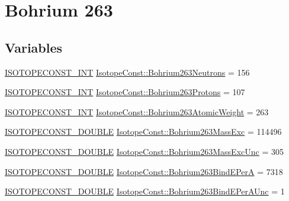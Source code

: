 \hypertarget{group___isotope_const-_bohrium-_bh263}{}\section{Bohrium 263}
\label{group___isotope_const-_bohrium-_bh263}
\subsection*{Variables}
\begin{DoxyCompactItemize}
\item 
\mbox{\hyperlink{group___isotope_const-_macros_ga5f18360b3e99483a35c32d789e62621c}{I\+S\+O\+T\+O\+P\+E\+C\+O\+N\+S\+T\+\_\+\+I\+NT}} \mbox{\hyperlink{group___isotope_const-_bohrium-_bh263_gabe146e083f2eaa5c4b29826724b8ebb7}{Isotope\+Const\+::\+Bohrium263\+Neutrons}} = 156
\item 
\mbox{\hyperlink{group___isotope_const-_macros_ga5f18360b3e99483a35c32d789e62621c}{I\+S\+O\+T\+O\+P\+E\+C\+O\+N\+S\+T\+\_\+\+I\+NT}} \mbox{\hyperlink{group___isotope_const-_bohrium-_bh263_ga82f6efe19e6ddfce1a8f6f28561320ca}{Isotope\+Const\+::\+Bohrium263\+Protons}} = 107
\item 
\mbox{\hyperlink{group___isotope_const-_macros_ga5f18360b3e99483a35c32d789e62621c}{I\+S\+O\+T\+O\+P\+E\+C\+O\+N\+S\+T\+\_\+\+I\+NT}} \mbox{\hyperlink{group___isotope_const-_bohrium-_bh263_gaa48fe65d50dc0d74b90ad1e79e9abb12}{Isotope\+Const\+::\+Bohrium263\+Atomic\+Weight}} = 263
\item 
\mbox{\hyperlink{group___isotope_const-_macros_ga8f45a7272ce02c0b4c65c44636ed719a}{I\+S\+O\+T\+O\+P\+E\+C\+O\+N\+S\+T\+\_\+\+D\+O\+U\+B\+LE}} \mbox{\hyperlink{group___isotope_const-_bohrium-_bh263_gabc855dd410f304a103fd7f09513dd2cd}{Isotope\+Const\+::\+Bohrium263\+Mass\+Exc}} = 114496
\item 
\mbox{\hyperlink{group___isotope_const-_macros_ga8f45a7272ce02c0b4c65c44636ed719a}{I\+S\+O\+T\+O\+P\+E\+C\+O\+N\+S\+T\+\_\+\+D\+O\+U\+B\+LE}} \mbox{\hyperlink{group___isotope_const-_bohrium-_bh263_ga3e44432285e968b252f8b683de67c250}{Isotope\+Const\+::\+Bohrium263\+Mass\+Exc\+Unc}} = 305
\item 
\mbox{\hyperlink{group___isotope_const-_macros_ga8f45a7272ce02c0b4c65c44636ed719a}{I\+S\+O\+T\+O\+P\+E\+C\+O\+N\+S\+T\+\_\+\+D\+O\+U\+B\+LE}} \mbox{\hyperlink{group___isotope_const-_bohrium-_bh263_ga78b636bb38714eb57520e5d6e46a314c}{Isotope\+Const\+::\+Bohrium263\+Bind\+E\+PerA}} = 7318
\item 
\mbox{\hyperlink{group___isotope_const-_macros_ga8f45a7272ce02c0b4c65c44636ed719a}{I\+S\+O\+T\+O\+P\+E\+C\+O\+N\+S\+T\+\_\+\+D\+O\+U\+B\+LE}} \mbox{\hyperlink{group___isotope_const-_bohrium-_bh263_ga4f2491e13c40b57f3933815bf66e1cb8}{Isotope\+Const\+::\+Bohrium263\+Bind\+E\+Per\+A\+Unc}} = 1

\end{DoxyCompactItemize}
